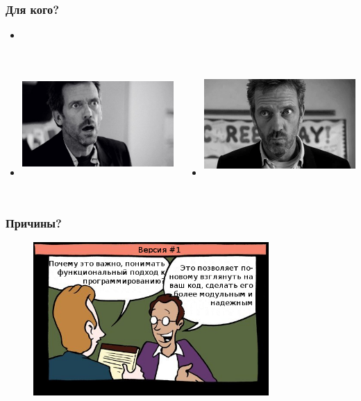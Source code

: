 \documentclass[18pt, compress, aspectratio=169]{beamer}
\begin{document}
\begin{frame}[fragile]
    \frametitle{Для кого?}
    \begin{itemize}
        \item <+->
    \end{itemize}

    \vspace{-40pt}
    \begin{columns}[T,onlytextwidth]
    \begin{itemize}
        \item <+->\includegraphics[width=7cm,height=4cm]{house1.jpeg}
    \end{itemize}

    \begin{itemize}
        \item <+->\includegraphics[width=7cm,height=4cm]{house2.png}
    \end{itemize}
    \end{columns}
\end{frame}

\begin{frame}
    \frametitle{Причины?}
    \vspace{-25pt}
    \begin{figure}
        \includegraphics[width=0.8\textwidth,center]{first_option.png}
    \end{figure}
\end{frame}
\end{document}
